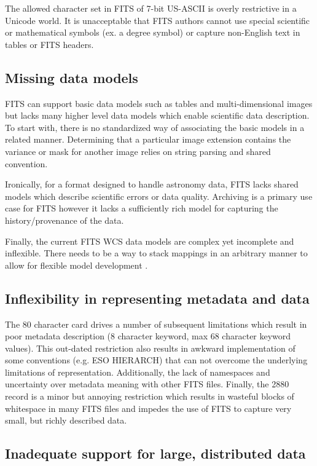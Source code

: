 \documentclass[11pt,twoside]{article}
\begin{document}
The allowed character set in FITS of 7-bit US-ASCII is overly restrictive in a
Unicode world. It is unacceptable that FITS authors cannot use special 
scientific or mathematical symbols (ex. a degree symbol) or capture 
non-English text in tables or FITS headers.

\subsection{Missing data models}

FITS can support basic data models such as tables and multi-dimensional 
images but lacks many higher level data models which enable scientific
data description. To start with, there is no standardized way of associating
the basic models in a related manner. Determining that a particular image 
extension contains the variance or mask for another image relies on string 
parsing and shared convention. 

Ironically, for a format designed to handle astronomy data, FITS lacks shared
models which describe scientific errors or data quality. Archiving is
a primary use case for FITS however it lacks a sufficiently rich model 
for capturing the history/provenance of the data.

Finally, the current FITS WCS data models are complex yet incomplete and
inflexible. There needs to be a way to stack mappings in an arbitrary
manner to allow for flexible model development \citep[see
e.g.][]{1998ASPC..145...41W,2012ASPC..461..825B,O35_adassxxii}.


\subsection{Inflexibility in representing metadata and data}

The 80 character card drives a number of subsequent limitations which
result in poor metadata description (8 character keyword, max 68 character keyword values). 
This out-dated restriction also results in awkward implementation 
of some conventions (e.g. ESO HIERARCH) that can not overcome the 
underlying limitations of representation. Additionally, the lack of 
namespaces and uncertainty over metadata meaning with other FITS files.
Finally, the 2880 record is a minor but annoying restriction which results
in wasteful blocks of whitespace in many FITS files and impedes the use
of FITS to capture very small, but richly described data.

\subsection{Inadequate support for large, distributed data}
\end{document}

